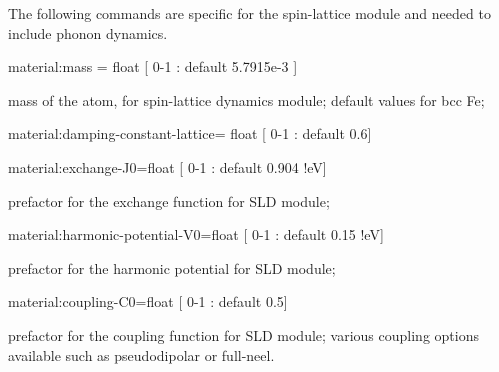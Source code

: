 The following commands are specific for the spin-lattice module and needed to include phonon dynamics.

{\zicf material:mass = float [ 0-1 : default 5.7915e-3 ]} mass of the atom, for spin-lattice dynamics module; default values for bcc Fe;

{\zicf material:damping-constant-lattice= float [ 0-1 : default 0.6]}

{\zicf material:exchange-J0=float [ 0-1 : default 0.904 !eV]}  prefactor for the exchange function for SLD module;

{\zicf material:harmonic-potential-V0=float [ 0-1 : default 0.15 !eV]}  prefactor for the harmonic potential for SLD module;

{\zicf material:coupling-C0=float [ 0-1 : default 0.5]}  prefactor for the coupling function for SLD module; various coupling options available such as pseudodipolar or full-neel.











%
